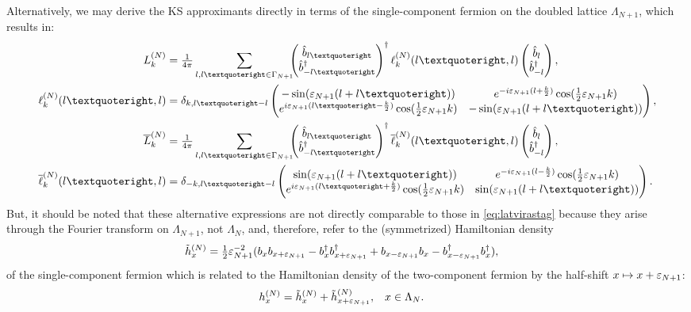 \documentclass[a4paper, 11pt]{article}
\DeclareMathOperator{\1}{\mathds{1}}
\begin{document}
Alternatively, we may derive the KS approximants directly in terms of the single-component fermion on the doubled lattice $\Lambda_{N+1}$, which results in:
\begin{align}
\label{eq:latvirastag1c}
L_k^{(N)} & = \tfrac{1}{4\pi}\sum_{l,l’\in\Gamma_{N+1}} \!\!\! \begin{pmatrix} \hat{b}_{l’} \\ \hat{b}^{\dag}_{-l’} \end{pmatrix}^{\dag} \ell^{(N)}_{k}(l’,l) \begin{pmatrix} \hat{b}_{l} \\ \hat{b}^{\dag}_{-l} \end{pmatrix}, \\ \nonumber
\ell^{(N)}_{k}(l’,l) & = \delta_{k,l’-l} \begin{pmatrix} -\sin(\varepsilon_{N+1}(l+l’)) & e^{-i\varepsilon_{N+1}(l+\frac{k}{2})}\cos(\tfrac{1}{2}\vep_{N+1}k) \\ e^{i\varepsilon_{N+1}(l’-\frac{k}{2})}\cos(\tfrac{1}{2}\vep_{N+1}k) & -\sin(\varepsilon_{N+1}(l+l’)) \end{pmatrix}, \\ \nonumber
\overline{L}_k^{(N)} & = \tfrac{1}{4\pi}\sum_{l,l’\in\Gamma_{N+1}} \!\!\! \begin{pmatrix} \hat{b}_{l’} \\ \hat{b}^{\dag}_{-l’} \end{pmatrix}^{\dag} \overline{\ell}^{(N)}_{k}(l’,l) \begin{pmatrix} \hat{b}_{l} \\ \hat{b}^{\dag}_{-l} \end{pmatrix}, \\ \nonumber
\overline{\ell}^{(N)}_{k}(l’,l) & = \delta_{-k,l’-l} \begin{pmatrix} \sin(\varepsilon_{N+1}(l+l’)) & e^{-i\varepsilon_{N+1}(l-\frac{k}{2})}\cos(\tfrac{1}{2}\vep_{N+1}k) \\ e^{i\varepsilon_{N+1}(l’+\frac{k}{2})}\cos(\tfrac{1}{2}\vep_{N+1}k) & \sin(\varepsilon_{N+1}(l+l’)) \end{pmatrix}.
\end{align}
But, it should be noted that these alternative expressions are not directly comparable to those in \eqref{eq:latvirastag} because they arise through the Fourier transform on $\Lambda_{N+1}$, not $\Lambda_{N}$, and, therefore, refer to the (symmetrized) Hamiltonian density 
\begin{align*}
\tilde{h}^{(N)}_{x} & = \tfrac{1}{2}\varepsilon_{N+1}^{-2}(b_{x}b_{x+\varepsilon_{N+1}}-b^{\dag}_{x}b^{\dag}_{x+\varepsilon_{N+1}}+b_{x-\varepsilon_{N+1}}b_{x}-b^{\dag}_{x-\varepsilon_{N+1}}b^{\dag}_{x}),
\end{align*}
of the single-component fermion which is related to the Hamiltonian density of the two-component fermion by the half-shift $x\mapsto x+\varepsilon_{N+1}$:
\begin{align}
\label{eq:hdstag1c}
h^{(N)}_{x} & = \tilde{h}^{(N)}_{x} + \tilde{h}^{(N)}_{x+\varepsilon_{N+1}}, & x & \in\Lambda_{N}.
\end{align}
\end{document}
